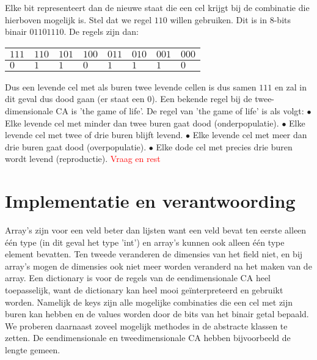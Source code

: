\documentclass[12pt,a4paper]{article}
\begin{document}
Elke bit representeert dan de nieuwe staat die een cel krijgt bij de combinatie die hierboven mogelijk is.
Stel dat we regel $110$ willen gebruiken. Dit is in 8-bits binair $01101110$.
De regels zijn dan:
\begin{center}
\begin{tabular}{|m{0.6cm}|m{0.6cm}|m{0.6cm}|m{0.6cm}|m{0.6cm}|m{0.6cm}|m{0.6cm}|m{0.6cm}|}
    \hline
    $111$ & $110$ & $101$ & $100$ & $011$ & $010$ & $001$ & $000$ \\
    \hline
    $0$ & $1$ & $1$ & $0$ & $1$ & $1$ & $1$ & $0$ \\
    \hline
\end{tabular}
\end{center}
\vspace{10pt}
Dus een levende cel met als buren twee levende cellen is dus samen $111$ en zal in dit geval dus dood gaan (er staat een $0$).
Een bekende regel bij de twee-dimensionale CA is 'the game of life'. 
\newline
De regel van 'the game of life' is als volgt:
\vspace{4pt}
\newline
$\bullet$ Elke levende cel met minder dan twee buren gaat dood (onderpopulatie). 
\newline 
$\bullet$ Elke levende cel met twee of drie buren blijft levend.
\newline
$\bullet$ Elke levende cel met meer dan drie buren gaat dood (overpopulatie).
\newline 
$\bullet$ Elke dode cel met precies drie buren wordt levend (reproductie).
\newline
\vspace{8pt}
\textcolor{red}{Vraag en rest}


\section*{Implementatie en verantwoording}
Array's zijn voor een veld beter dan lijsten want een veld bevat ten eerste alleen één type (in dit geval het type 'int') 
en array's kunnen ook alleen één type element bevatten.  
Ten tweede veranderen de dimensies van het field niet, en bij array's mogen de dimensies ook niet meer worden veranderd na
het maken van de array. Een dictionary is voor de regels van de eendimensionale CA heel toepasselijk, want 
de dictionary kan heel mooi geïnterpreteerd en gebruikt worden. 
Namelijk de keys zijn alle mogelijke combinaties die een cel met zijn buren kan hebben
en de values worden door de bits van het binair getal bepaald. 
We proberen daarnaast zoveel mogelijk methodes in de abstracte klassen te zetten.
De eendimensionale en tweedimensionale CA hebben bijvoorbeeld de lengte gemeen.   
\end{document}
